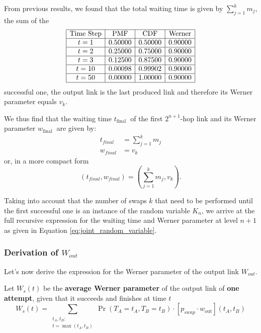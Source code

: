\documentclass{masterthesis}
\begin{document}
From previous results, we found that the total waiting time is given by $\sum_{j=1}^{k} m_{j}$, the sum of the \begin{equation*}
    \begin{array}{|c|c|c|c|}
        \hline
        \text{Time Step} & \text{PMF} & \text{CDF} & \text{Werner} \\
        \hline
        t = 1 & 0.50000 & 0.50000 & 0.90000 \\
        \hline
        t = 2 & 0.25000 & 0.75000 & 0.90000 \\
        \hline
        t = 3 & 0.12500 & 0.87500 & 0.90000 \\
        \hline
        t = 10 & 0.00098 & 0.99902 & 0.90000 \\
        \hline
        t = 50 & 0.00000 & 1.00000 & 0.90000 \\
        \hline
    \end{array}
\end{equation*}successful one, the output link is the last produced link and therefore its Werner parameter equals $v_{k}$. 

We thus find that the waiting time $t_{\text {final }}$ of the first $2^{n+1}$-hop link and its Werner parameter $w_{\text {final }}$ are given by:
\begin{align}
    t_{final} &= \sum_{j=1}^{k} m_{j} \\ 
    w_{final} &= v_k 
\end{align}
or, in a more compact form
\begin{equation}
    \left(t_{final}, w_{final}\right) = \left(\sum_{j=1}^{k} m_{j}, v_{k}\right) .
\end{equation}

Taking into account that the number of swaps $k$ that need to be performed until the first successful one is an instance of the random variable $K_{n}$, we arrive at the full recursive expression for the waiting time and Werner parameter at level $n+1$ as given in Equation \ref{eq:joint_random_variable}.

\subsubsection*{Derivation of $W_{out}$}
Let's now derive the expression for the Werner parameter of the output link $W_{out}$.

Let $W_{s}(t)$ be the \textbf{average Werner parameter} of the output link of \textbf{one attempt}, given that it succeeds and finishes at time $t$
\begin{equation}
    W_s(t) = \sum_{\substack{t_A, t_B:\\ t = \max(t_A, t_B)}} \Pr(T_A = t_A, T_B = t_B) \cdot [p_{swap} \cdot w_{\text{out}}](t_A, t_B)
\end{equation}
\end{document}
